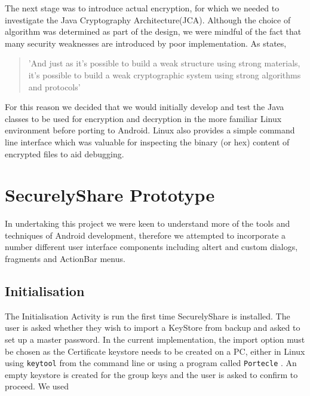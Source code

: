 The next stage was to introduce actual encryption, for which we needed to investigate the Java Cryptography Architecture(JCA).  Although the choice of algorithm was determined as part of the design, we were mindful of the fact that  many security weaknesses are introduced by poor implementation. As \cite{schneier1998security} states,
\begin{quotation}
'And just as it's possible to build a weak structure using strong materials, it's possible to build a weak cryptographic system using strong algorithms and protocols' 
\end{quotation}  
For this reason we decided that we would initially develop and test the  Java classes to be used for encryption and decryption in the more familiar Linux environment before porting to Android.  Linux also provides a simple command line interface which was valuable for inspecting the binary (or hex) content of encrypted files to aid debugging.

\section{SecurelyShare Prototype}
In undertaking this project we were keen to understand more of the tools and techniques of Android development, therefore we attempted to incorporate a number different user interface components including altert and custom dialogs, fragments and ActionBar menus.
\subsection*{Initialisation}

The Initialisation Activity is run the first time SecurelyShare is installed.  The user is asked whether they wish to import a KeyStore from backup and asked to set up a master password.  In the current implementation, the import option must be chosen as the Certificate keystore needs to be created on a PC, either in Linux using  \texttt{keytool} from the command line or using a program called \texttt{Portecle}  \cite{portecle}.  An empty keystore is created for the group keys and the user is asked to confirm to proceed.  We used 

